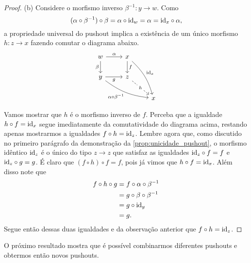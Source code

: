 \begin{proof}
    \smallskip
    (b) Considere o morfismo inverso $\beta^{-1}: y \to w$.
    Como
    \begin{displaymath}
      (\alpha \circ \beta^{-1}) \circ \beta
      = \alpha \circ \mathrm{id}_w
      = \alpha
      = \mathrm{id}_x \circ \alpha,
    \end{displaymath}
    a propriedade universal do pushout implica a existência de um único morfismo $h: z \to x$ fazendo comutar o diagrama abaixo.
    \begin{displaymath}
        \begin{tikzcd}
            w
            \arrow[r, "\alpha"]
            \arrow[d, "\beta" swap]
            & x
            \arrow[d, "f"]
            \arrow[rdd, bend left=15, "\id_x"]
            \\ y
            \arrow[r, "g" swap]
            \arrow[rrd, bend right=15, "\alpha \circ \beta^{-1}" swap]
            & z
            \arrow[rd, dashed, "h" description]
            \\ & & x
        \end{tikzcd}
    \end{displaymath}

    Vamos mostrar que $h$ é o morfismo inverso de $f$.
    Perceba que a igualdade $h \circ f = \mathrm{id}_x$ segue imediatamente da comutatividade do diagrama acima, restando apenas mostrarmos a igualdades $f \circ h = \mathrm{id}_z$.
    Lembre agora que, como discutido no primeiro parágrafo da demonstração da \cref{prop:unicidade_pushout}, o morfismo idêntico $\mathrm{id}_z$ é o único do tipo $z \to z$ que satisfaz as igualdades $\mathrm{id}_z \circ f = f$ e $\mathrm{id}_z \circ g = g$.
    É claro que $(f \circ h) \circ f = f$, pois já vimos que $h \circ f = \mathrm{id}_x$.
    Além disso note que
    \begin{align*}
      f \circ h \circ g
      & = f \circ \alpha \circ \beta^{-1} \\
      & = g \circ \beta \circ \beta^{-1} \\
      & = g \circ \mathrm{id}_y \\
      & = g.
    \end{align*}
    Segue então dessas duas igualdades e da observação anterior que $f \circ h = \mathrm{id}_z$.
 \end{proof}

 O próximo resultado mostra que é possível combinarmos diferentes pushouts e obtermos então novos pushouts.

